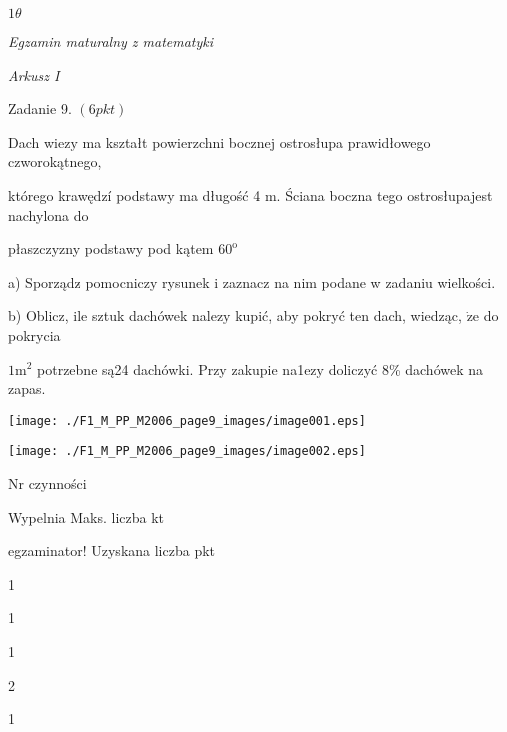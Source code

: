 \documentclass[a4paper,12pt]{article}
\begin{document}
$ 1\theta$

{\it Egzamin maturalny z matematyki}

{\it Arkusz I}

Zadanie 9. $(6pkt)$

Dach wiez$\mathrm{y}$ ma kształt powierzchni bocznej ostrosłupa prawidłowego czworokątnego,

którego krawędzí podstawy ma długość 4 $\mathrm{m}$. Ściana boczna tego ostrosłupajest nachylona do

płaszczyzny podstawy pod kątem $60^{\mathrm{o}}$

a) Sporządz$\acute{}$ pomocniczy rysunek i zaznacz na nim podane w zadaniu wielkości.

b) Oblicz, ile sztuk dachówek nalez$\mathrm{y}$ kupić, aby pokryć ten dach, wiedząc, $\dot{\mathrm{z}}\mathrm{e}$ do pokrycia

$1\mathrm{m}^{2}$ potrzebne są24 dachówki. Przy zakupie na1ez$\mathrm{y}$ doliczyć 8\% dachówek na zapas.
\begin{center}
\texttt{[image: ./F1\_M\_PP\_M2006\_page9\_images/image001.eps]}

\texttt{[image: ./F1\_M\_PP\_M2006\_page9\_images/image002.eps]}
\end{center}
Nr czynności

Wypelnia Maks. liczba kt

egzaminator! Uzyskana liczba pkt

1

1

1

2

1
\end{document}
